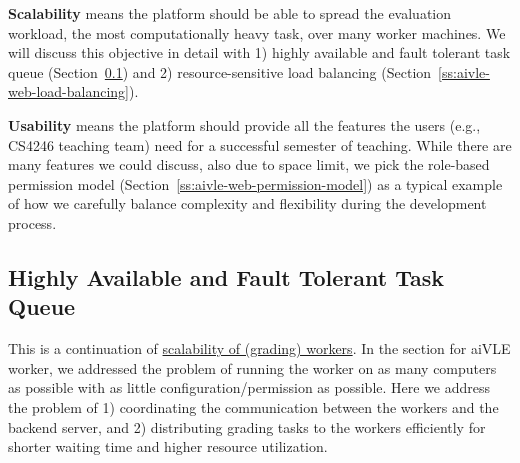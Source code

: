 \textbf{Scalability} means the platform should be able to spread the evaluation workload, the most computationally heavy task, over many worker machines. We will discuss this objective in detail with 1) highly available and fault tolerant task queue (Section~\ref{ch:aivle-web_highly-available-task-queue}) and 2) resource-sensitive load balancing (Section~\ref{ss:aivle-web-load-balancing}).

\textbf{Usability} means the platform should provide all the features the users (e.g., CS4246 teaching team) need for a successful semester of teaching. While there are many features we could discuss, also due to space limit, we pick the role-based permission model (Section~\ref{ss:aivle-web-permission-model}) as a typical example of how we carefully balance complexity and flexibility during the development process.

\subsection{Highly Available and Fault Tolerant Task Queue}
\label{ch:aivle-web_highly-available-task-queue}
This is a continuation of \hyperref[ss:aivle-worker-design-goal]{scalability of (grading) workers}. In the section for aiVLE worker, we addressed the problem of running the worker on as many computers as possible with as little configuration/permission as possible. Here we address the problem of 1) coordinating the communication between the workers and the backend server, and 2) distributing grading tasks to the workers efficiently for shorter waiting time and higher resource utilization.
